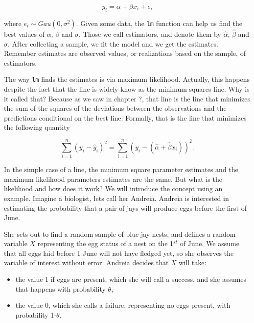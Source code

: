 \documentclass[
]{book}
\providecommand{\tightlist}{%
  \setlength{\itemsep}{0pt}\setlength{\parskip}{0pt}}
\begin{document}
\[y_i=\alpha+\beta x_i+e_i\]

where \(e_i \sim Gau(0,\sigma^2)\). Given some data, the \texttt{lm} function can help us find the best values of \(\alpha\), \(\beta\) and \(\sigma\). Those we call estimators, and denote them by \(\hat \alpha\), \(\hat \beta\) and \(\hat \sigma\). After collecting a sample, we fit the model and we get the estimates. Remember estimates are observed values, or realizations based on the sample, of estimators.

The way \texttt{lm} finds the estimates is via maximum likelihood. Actually, this happens despite the fact that the line is widely know as the minimum squares line. Why is it called that? Because as we saw in chapter ?, that line is the line that minimizes the sum of the squares of the deviations between the observations and the predictions conditional on the best line. Formally, that is the line that minimizes the following quantity

\[\sum_{i=1}^n (y_i-\hat y_i)^2=\sum_{i=1}^n (y_i-(\hat \alpha+ \hat \beta x_i))^2.\]

In the simple case of a line, the minimum square parameter estimates and the maximum likelihood parameters estimates are the same. But what is the likelihood and how does it work? We will introduce the concept using an example. Imagine a biologist, lets call her Andreia. Andreia is interested in estimating the probability that a pair of jays will produce eggs before the first of June.

She sets out to find a random sample of blue jay nests, and defines a random variable \(X\) representing the egg status of a nest on the 1\(^{st}\) of June. We assume that all eggs laid before 1 June will not have fledged yet, so she observes the variable of interest without error. Andreia decides that \(X\) will take:

\begin{itemize}
\tightlist
\item
  the value 1 if eggs are present, which she will call a success, and she assumes that happens with probability \(\theta\),
\item
  the value 0, which she calls a failure, representing no eggs present, with probability 1-\(\theta\).
\end{itemize}
\end{document}
